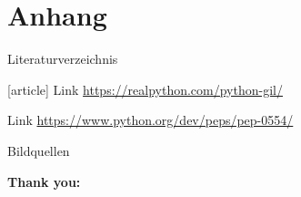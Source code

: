 \section{Anhang}

\begin{frame}{Literaturverzeichnis}
    \begin{thebibliography}{Längste Bezeichnung}
        [article]
            \newblock Link \url{https://realpython.com/python-gil/}
            
           \newblock Link \url{https://www.python.org/dev/peps/pep-0554/} 
                      
    \end{thebibliography}
\end{frame}

{
    \tiny
    \begin{frame}{Bildquellen}

        \textbf{Thank you:} \\
    \end{frame}
}
